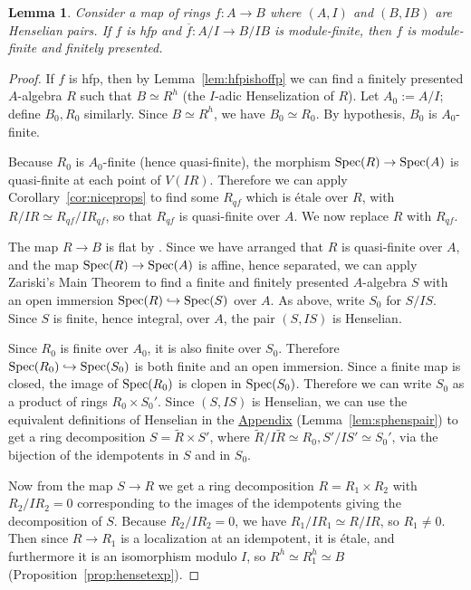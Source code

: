 \documentclass[12pt]{article}
\newcommand{\spec}{{\rm Spec}}
\newcommand{\ol}[1]{\overline{#1}}
\newcommand{\Et}{\'etale\xspace}
\newcommand{\hfp}{hfp\xspace}
\newcommand{\spcite}[2]{\cite[\href{https://stacks.math.columbia.edu/tag/#1}{{#2} {#1}}]{stackp}}
\newtheorem{lemma}[theorem]{Lemma}
\theoremstyle{definition}
\numberwithin{equation}{subsection}
\begin{document}
\begin{lemma}\label{lem:betterfin} Consider a map of rings $f: A \to B$ where $(A,I)$ and $(B,IB)$ are Henselian pairs. If $f$ is \hfp and $\ol{f}: A/I \to B/IB$ is module-finite, then $f$ is module-finite and finitely presented.
\end{lemma}
\begin{proof} If $f$ is \hfp, then by Lemma~\ref{lem:hfpishoffp} we can find a finitely presented $A$-algebra $R$ such that $B \simeq R^h$ (the $I$-adic Henselization of $R$). Let $A_0 := A/I$; define $B_0,R_0$ similarly. Since $B \simeq R^h$, we have $B_0 \simeq R_0$. By hypothesis, $B_0$ is $A_0$-finite.

Because $R_0$ is $A_0$-finite (hence quasi-finite), the morphism $\spec(R) \nobreak\to\nobreak \spec(A)$ is quasi-finite at each point of $V(IR)$. Therefore we can apply Corollary~\ref{cor:niceprops} to find some $R_{qf}$ which is \Et over $R$, with $R/IR \simeq R_{qf}/IR_{qf}$, so that $R_{qf}$ is quasi-finite over $A$. We now replace $R$ with $R_{qf}$. 

The map $R \to B$ is flat by \spcite{0AGU}{Lemma}. Since we have arranged that $R$ is quasi-finite over $A$, and the map $\spec(R) \to \spec(A)$ is affine, hence separated, we can apply Zariski's Main Theorem \spcite{05K0}{Lemma} to find a finite and finitely presented $A$-algebra $S$ with an open immersion $\spec(R) \hookrightarrow \spec(S)$ over $A$. As above, write $S_0$ for $S/IS$. Since $S$ is finite, hence integral, over $A$, the pair $(S,IS)$ is Henselian. 

Since $R_0$ is finite over $A_0$, it is also finite over $S_0$. Therefore $\spec(R_0) \hookrightarrow \spec(S_0)$ is both finite and an open immersion. Since a finite map is closed, the image of $\spec(R_0)$ is clopen in $\spec(S_0)$. Therefore we can write $S_0$ as a product of rings $R_0 \times S_0'$. Since $(S,IS)$ is Henselian, we can use the equivalent definitions of Henselian in the \hyperref[sec:appendix]{Appendix} (Lemma~\ref{lem:sphenspair}) to get a ring decomposition $S = \widetilde{R} \times S'$, where $\widetilde{R}/I\widetilde{R} \simeq R_0, S'/IS' \simeq S_0'$, via the bijection of the idempotents in $S$ and in $S_0$.

Now from the map $S \to R$ we get a ring decomposition $R = R_1 \times R_2$ with $R_2/IR_2=0$ corresponding to the images of the idempotents giving the decomposition of $S$. Because $R_2/IR_2=0$, we have $R_1/IR_1 \simeq R/IR$, so $R_1 \ne 0$. Then since $R \to R_1$ is a localization at an idempotent, it is \Et, and furthermore it is an isomorphism modulo $I$, so $R^h \simeq R_1^h \simeq B$ (Proposition~\ref{prop:hensetexp}).


\end{proof}
\end{document}
